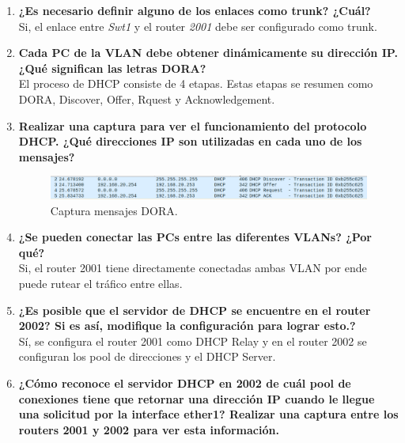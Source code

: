 \documentclass[letterpaper,12pt]{article}
\begin{document}
\begin{enumerate}
    \item \textbf{¿Es necesario definir alguno de los enlaces como trunk? ¿Cuál?} \\
    Si, el enlace entre \textit{Swt1} y el router \textit{2001} debe ser configurado como trunk.
    
    \item \textbf{Cada PC de la VLAN debe obtener dinámicamente su dirección IP. ¿Qué significan las letras DORA?} \\
    El proceso de DHCP consiste de 4 etapas. Estas etapas se resumen como DORA, Discover, Offer, Rquest y Acknowledgement. 

    \item \textbf{Realizar una captura para ver el funcionamiento del protocolo DHCP. ¿Qué direcciones IP son utilizadas en cada uno de los mensajes?}
    \begin{figure}[ht] 
        
        \centering \includegraphics[width=0.8\columnwidth]{lab12.PNG}
        \caption{
                \label{fig:samplesetup} 
                Captura mensajes DORA.
        }
    \end{figure}

    \item \textbf{¿Se pueden conectar las PCs entre las diferentes VLANs? ¿Por qué?} \\
    Si, el router 2001 tiene directamente conectadas ambas VLAN por ende puede rutear el tráfico entre ellas. 
    
    \item \textbf{¿Es posible que el servidor de DHCP se encuentre en el router 2002? Si es así, modifique la configuración para lograr esto.?} \\
    Sí, se configura el router 2001 como DHCP Relay y en el router 2002 se configuran los pool de direcciones y el DHCP Server.
    
    \item \textbf{¿Cómo reconoce el servidor DHCP en 2002 de cuál pool de conexiones tiene que retornar una dirección IP cuando le llegue una solicitud por la interface ether1? Realizar una captura entre los routers 2001 y 2002 para ver esta información.} \\
    

\end{enumerate}
\end{document}
